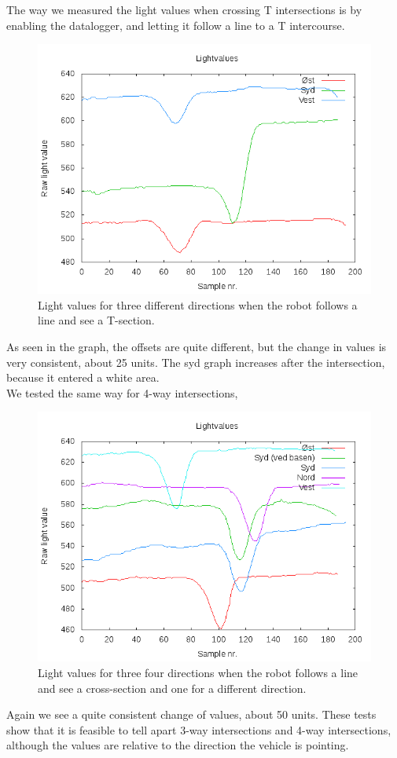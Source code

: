 The way we measured the light values when crossing T intersections is by
enabling the datalogger, and letting it follow a line to a T
intercourse.
\begin{figure}[hbt]
  \centering
  \includegraphics[scale=0.5]{../experiments/2prototype/results/gnuplot/retningsbaseret_3vejs.png}
  \caption{Light values for three different directions when the robot follows a line and see a T-section.}
\end{figure}
As
seen in the graph, the offsets are quite different, but the change in
values is very consistent, about 25 units. The syd graph increases after
the intersection, because it entered a white area.\\We tested the same
way for 4-way intersections,
\begin{figure}[hbt]
  \centering
  \includegraphics[scale=0.5]{../experiments/2prototype/results/gnuplot/retningsbaseret_4vejs.png}
  \caption{Light values for three four directions when the robot follows a line and see a cross-section and one for a different direction.}
\end{figure}
Again
we see a quite consistent change of values, about 50 units. These tests
show that it is feasible to tell apart 3-way intersections and 4-way
intersections, although the values are relative to the direction the
vehicle is pointing.


